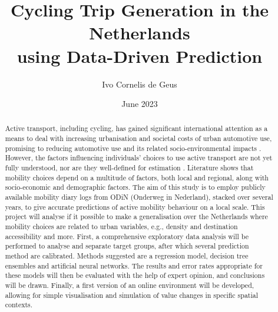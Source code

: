 \documentclass[sigconf, natbib=false, nonacm]{acmart}
\begin{document}
\title{
    Cycling Trip Generation in the Netherlands \\ 
    using Data-Driven Prediction}
\author{Ivo Cornelis de Geus}
\date{June 2023}

\begin{abstract}
    Active transport, including cycling, has gained significant international attention as a means to deal with increasing urbanisation and societal costs of urban automotive use, promising to reducing automotive use and its related socio-environmental impacts \parencite{un_68_2018}. However, the factors influencing individuals' choices to use active transport are not yet fully understood, nor are they well-defined for estimation \parencite{stevens_does_2017, ewing_travel_2010, naess_meta-analyses_2022}. Literature shows that mobility choices depend on a multitude of factors, both local and regional, along with socio-economic and demographic factors. The aim of this study is to employ publicly available mobility diary logs from ODiN (Onderweg in Nederland), stacked over several years, to give accurate predictions of active mobility behaviour on a local scale. This project will analyse if it possible to make a generalisation over the Netherlands where mobility choices are related to urban variables, e.g., density and destination accessibility and more. First, a comprehensive exploratory data analysis will be performed to analyse and separate target groups, after which several prediction method are calibrated. Methods suggested are a regression model, decision tree ensembles and artificial neural networks. The results and error rates appropriate for these models will then be evaluated with the help of expert opinion, and conclusions will be drawn. Finally, a first version of an online environment will be developed, allowing for simple visualisation and simulation of value changes in specific spatial contexts. 
\end{abstract}

\maketitle
\end{document}
